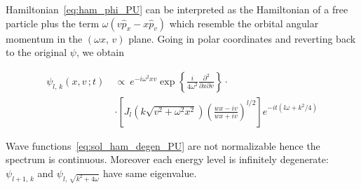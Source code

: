 Hamiltonian~\eqref{eq:ham_phi_PU} can be interpreted as the Hamiltonian of a
free particle plus the term $\omega \left(v \hat{p}_x - x \hat{p}_v \right)$
which resemble the orbital angular momentum in the $(\omega x, \, v)$ plane.
Going in polar coordinates and reverting back to the original $\psi$, we obtain

\begin{align} \label{eq:sol_ham_degen_PU}
  \psi_{l, \, k}(x, v \,; t) \ &\propto \
  e^{-i\omega^2xv}
  \exp\left\{
    \frac{i}{4\omega^2} \frac{\partial^2}{\partial x \partial v}
  \right\} \cdot \nonumber \\
  &\cdot \left[
    J_l \left(k\sqrt{v^2 + \omega^2 x^2}\right)
    {\left( \frac{wx - iv}{wx +iv} \right)}^{l/2}
  \right]
  e^{-it (l\omega + k^2/4)}
\end{align}

Wave functions~\eqref{eq:sol_ham_degen_PU} are not normalizable hence the
spectrum is continuous. Moreover each energy level is infinitely degenerate:
$\psi_{l+1, \, k}$ and $\psi_{l, \, \sqrt{k^2 + 4 \omega}}$ have same
eigenvalue.
